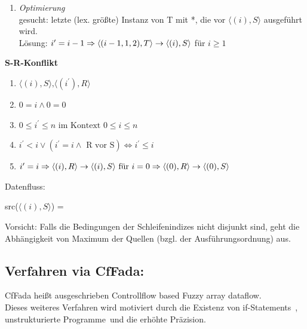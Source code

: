 \begin{enumerate}
\item \textit{Optimierung}\\
    gesucht: letzte (lex. größte) Instanz von T mit *, die vor $\langle (i), S \rangle$ ausgeführt wird. \\
    Lösung: $i^\prime = i-1\\
            \Rightarrow \langle (i-1,1,2), T \rangle \rightarrow \langle (i), S \rangle$ für $i \geq 1$
\end{enumerate}

\textbf{S-R-Konflikt}\\
    \begin{enumerate}
    \item $\langle (i), S \rangle \text{,} \langle(i^\prime), R \rangle$
    \item $0=i \land 0 = 0$
    \item $0 \leq i^\prime \leq n \text{ im Kontext } 0 \leq i \leq n$
    \item $i^\prime < i \lor (i^\prime = i \land \text{ R vor S}) \Leftrightarrow i^\prime \leq i$
    \item $i^\prime = i \\
        \Rightarrow \langle (i),R \rangle \rightarrow \langle (i), S \rangle \text{ für } i=0 \\
        \Rightarrow \langle (0),R \rangle \rightarrow \langle (0), S \rangle$

    \end{enumerate}
Datenfluss: \\
\begin{procedure}
    src($ \langle (i), S \rangle $) =\\ 
\end{procedure}

Vorsicht: Falls die Bedingungen der Schleifenindizes nicht disjunkt sind, geht die Abhängigkeit von Maximum der Quellen (bzgl. der Ausführungsordnung) aus.


\subsection{Verfahren via CfFada:}

CfFada heißt ausgeschrieben \glqq Controllflow based Fuzzy array dataflow\grqq.\\
Dieses weiteres Verfahren wird motiviert durch die Existenz von \glqq if-Statements\grqq\ , \glqq unstrukturierte Programme\grqq\ und die erhöhte \glqq Präzision\grqq.\\
